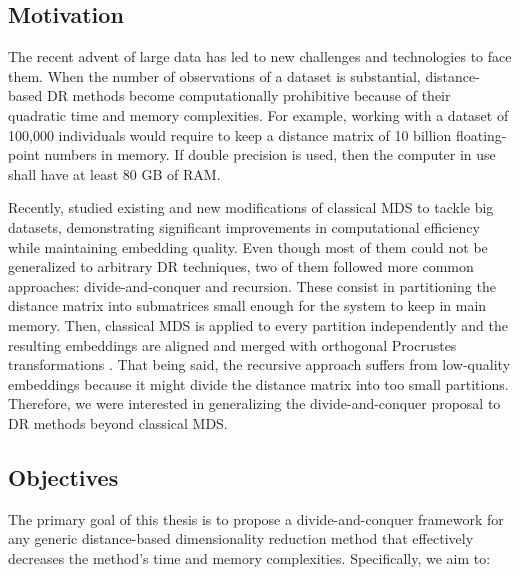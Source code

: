 \subsection{Motivation}

The recent advent of large data has led to new challenges and technologies to face them. When the number of observations of a dataset is substantial, distance-based DR methods become computationally prohibitive because of their quadratic time and memory complexities. For example, working with a dataset of 100,000 individuals would require to keep a distance matrix of 10 billion floating-point numbers in memory. If double precision is used, then the computer in use shall have at least 80 GB of RAM.

Recently, \citet{Delicado2024} studied existing and new modifications of classical MDS to tackle big datasets, demonstrating significant improvements in computational efficiency while maintaining embedding quality. Even though most of them could not be generalized to arbitrary DR techniques, two of them followed more common approaches: divide-and-conquer and recursion. These consist in partitioning the distance matrix into submatrices small enough for the system to keep in main memory. Then, classical MDS is applied to every partition independently and the resulting embeddings are aligned and merged with orthogonal Procrustes transformations \citep{Green1952}. That being said, the recursive approach suffers from low-quality embeddings because it might divide the distance matrix into too small partitions. Therefore, we were interested in generalizing the divide-and-conquer proposal to DR methods beyond classical MDS.

\subsection{Objectives}

The primary goal of this thesis is to propose a divide-and-conquer framework for any generic distance-based dimensionality reduction method that effectively decreases the method's time and memory complexities. Specifically, we aim to:

